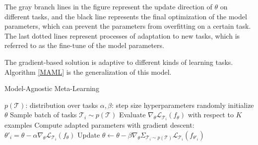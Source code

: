 The gray branch lines in the figure represent the update direction of $\theta$ on different tasks, and the black line represents the final optimization of the model parameters, which can prevent the parameters from overfitting on a certain task. The last dotted lines represent processes of adaptation to new tasks, which is referred to as the fine-tune of the model parameters.

The gradient-based solution is adaptive to different kinds of learning tasks. Algorithm \ref{MAML} is the generalization of this model.



\begin{algorithm}[h]
  \caption{Model-Agnostic Meta-Learning}
  \label{MAML}
  \begin{algorithmic}[1]
    \REQUIRE $p(\mathcal{T})$: distribution over tasks
    \REQUIRE $\alpha, \beta$: step size hyperparameters
    \STATE randomly initialize $\theta$
    \STATE Sample batch of tasks $\mathcal{T}_i \sim p(\mathcal{T})$
    \STATE Evaluate $\nabla_\theta \mathcal{L}_{\mathcal{T}_i} (f_\theta)$ with respect to $K$ examples
    \STATE Compute adapted parameters with gradient descent: $\theta'_i = \theta - \alpha\nabla_\theta \mathcal{L}_{\mathcal{T}_i} (f_\theta)$
    \ENDFOR
    \STATE Update $\theta \leftarrow \theta - \beta\nabla_\theta \Sigma_{\mathcal{T}_i \sim p(\mathcal{T})}\mathcal{L}_{\mathcal{T}_i} (f_{\theta'_i})$
    \ENDWHILE
  \end{algorithmic}
\end{algorithm}

